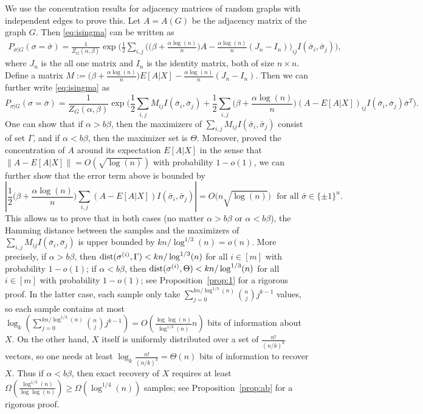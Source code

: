\documentclass{article}
\begin{document}
We use the concentration results for adjacency matrices of random graphs with independent edges to prove this. Let $A=A(G)$ be the adjacency matrix of the graph $G$. Then \eqref{eq:isingma} can be written as
\begin{align*}
 P_{\sigma|G}(\sigma=\bar{\sigma})  
=  \frac{1}{Z_G(\alpha,\beta)}
\exp\Big( \frac{1}{2} \sum_{i,j}\Big( \big(\beta+\frac{\alpha\log(n)}{n} \big) A
-\frac{\alpha\log(n)}{n} (J_n-I_n) \Big)_{ij} I(\bar{\sigma}_i,\bar{\sigma}_j) 
\Big)  ,
\end{align*}
where $J_n$ is the all one matrix and $I_n$ is the identity matrix, both of size $n\times n$.
Define a matrix
$
M:= \big(\beta+\frac{\alpha\log(n)}{n} \big) E[A|X]
-\frac{\alpha\log(n)}{n} (J_n-I_n).
$
Then we can further write \eqref{eq:isingma}
as
$$
P_{\sigma|G}(\sigma=\bar{\sigma})
= \frac{1}{Z_G(\alpha,\beta)}
\exp\Big( \frac{1}{2} \sum_{i,j} M_{ij} I(\bar{\sigma}_i, \bar{\sigma}_j) + \frac{1}{2} \sum_{i,j}\big(\beta+\frac{\alpha\log(n)}{n} \big)  (A-E[A|X])_{ij} I(\bar{\sigma}_i, \bar{\sigma}_j) 
  \bar{\sigma}^T 
\Big)  .
$$
One can show that if $\alpha>b\beta$, then the maximizers of $\sum_{i,j} M_{ij} I(\bar{\sigma}_i, \bar{\sigma}_j)$ consist of set $\Gamma$, and if $\alpha<b\beta$, then the maximizer set is $\Theta$.
Moreover, \cite{Hajek16} proved the concentration of $A$ around its expectation $E[A|X]$ in the sense that
$\|A-E[A|X]\| = O(\sqrt{\log(n)})$ with probability $1-o(1)$, we can further show that the error term above is bounded by
$$
\left|\frac{1}{2} \big(\beta+\frac{\alpha\log(n)}{n} \big)\sum_{i,j} (A-E[A|X])
 I( \bar{\sigma}_i, \bar{\sigma}_j) \right| = O \big( n \sqrt{\log(n)} \big)
  \text{~~for all~} \bar{\sigma}\in\{\pm 1\}^n  .
$$
This allows us to prove that in both cases (no matter $\alpha>b\beta$ or $\alpha<b\beta$), the Hamming distance between the samples and the maximizers of $\sum_{i,j}  M_{ij}I(\bar{\sigma}_i, \bar{\sigma}_j)$ is upper bounded by $kn/\log^{1/3}(n)=o(n)$.
More precisely, if $\alpha>b\beta$, then $\operatorname{dist}(\sigma^{(i)},\Gamma )< kn/\log^{1/3}(n)$ for all $i\in[m]$ with probability $1-o(1)$; if $\alpha<b\beta$, then $\operatorname{dist}(\sigma^{(i)}, \Theta)< kn/\log^{1/3}(n)$ for all $i\in[m]$ with probability $1-o(1)$; see Proposition~\ref{prop:1} for a rigorous proof.
In the latter case, each sample only take $\sum_{j=0}^{kn/\log^{1/3}(n)}\binom{n}{j}j^{k-1}$ values, so each sample contains at most $\log_k(\sum_{j=0}^{kn/\log^{1/3}(n)}\binom{n}{j}j^{k-1})=O(\frac{\log\log(n)}{\log^{1/3}(n)} n)$ bits of information about $X$. On the other hand, $X$ itself is uniformly distributed over a set of $\frac{n!}{(n/k)^k}$ vectors, so one needs at least $\log_k\frac{n!}{(n/k)^k}=\Theta(n)$ bits of information to recover $X$. Thus if $\alpha<b\beta$, then exact recovery of $X$ requires at least $\Omega(\frac{\log^{1/3}(n)}{\log\log(n)})\ge \Omega(\log^{1/4}(n))$ samples; see Proposition~\ref{prop:ab} for a rigorous proof.
\end{document}
